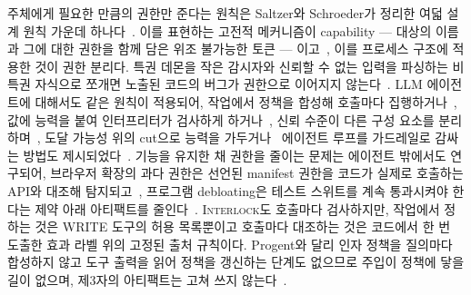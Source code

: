 \documentclass[acmsmall,screen,review,anonymous]{acmart}
\begin{document}
주체에게 필요한 만큼의 권한만 준다는 원칙은 Saltzer와 Schroeder가 정리한 여덟 설계 원칙 가운데 하나다~\cite{saltzer1975protection}. 이를 표현하는 고전적 메커니즘이 capability --- 대상의 이름과 그에 대한 권한을 함께 담은 위조 불가능한 토큰 --- 이고~\cite{dennis1966programming}, 이를 프로세스 구조에 적용한 것이 권한 분리다. 특권 데몬을 작은 감시자와 신뢰할 수 없는 입력을 파싱하는 비특권 자식으로 쪼개면 노출된 코드의 버그가 권한으로 이어지지 않는다~\cite{provos2003preventing}. LLM 에이전트에 대해서도 같은 원칙이 적용되어, 작업에서 정책을 합성해 호출마다 집행하거나~\cite{shi2025progent}, 값에 능력을 붙여 인터프리터가 검사하게 하거나~\cite{debenedetti2025defeating}, 신뢰 수준이 다른 구성 요소를 분리하며~\cite{costa2025securing}, 도달 가능성 위의 cut으로 능력을 가두거나~\cite{xiong2026reachability} 에이전트 루프를 가드레일로 감싸는 방법도 제시되었다~\cite{murugan2026}. 기능을 유지한 채 권한을 줄이는 문제는 에이전트 밖에서도 연구되어, 브라우저 확장의 과다 권한은 선언된 manifest 권한을 코드가 실제로 호출하는 API와 대조해 탐지되고~\cite{cheng2026percheck}, 프로그램 debloating은 테스트 스위트를 계속 통과시켜야 한다는 제약 아래 아티팩트를 줄인다~\cite{heo2018effective, sharif2018trimmer}. \textsc{Interlock}도 호출마다 검사하지만, 작업에서 정하는 것은 WRITE 도구의 허용 목록뿐이고 호출마다 대조하는 것은 코드에서 한 번 도출한 효과 라벨 위의 고정된 출처 규칙이다. Progent와 달리 인자 정책을 질의마다 합성하지 않고 도구 출력을 읽어 정책을 갱신하는 단계도 없으므로 주입이 정책에 닿을 길이 없으며, 제3자의 아티팩트는 고쳐 쓰지 않는다~\cite{shi2025progent}.
\end{document}
